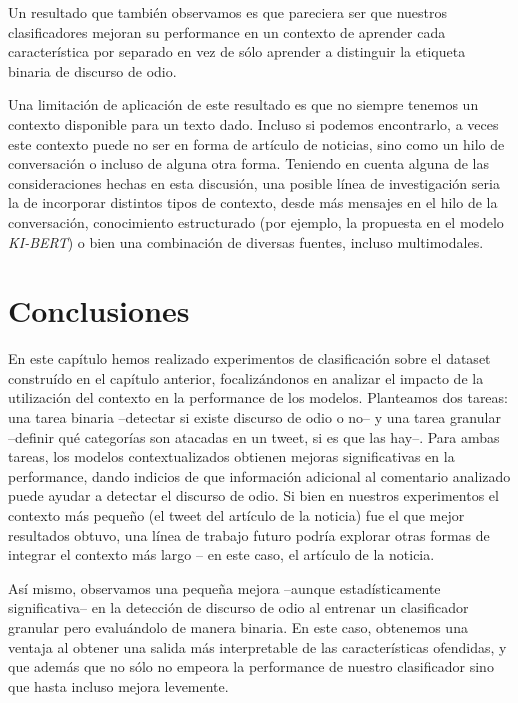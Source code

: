 Un resultado que también observamos es que pareciera ser que nuestros clasificadores mejoran su performance en un contexto de aprender cada característica por separado en vez de sólo aprender a distinguir la etiqueta binaria de discurso de odio.

Una limitación de aplicación de este resultado es que no siempre tenemos un contexto disponible para un texto dado. Incluso si podemos encontrarlo, a veces este contexto puede no ser en forma de artículo de noticias, sino como un hilo de conversación o incluso de alguna otra forma. Teniendo en cuenta alguna de las consideraciones hechas en esta discusión, una posible línea de investigación seria la de incorporar distintos tipos de contexto, desde más mensajes en el hilo de la conversación, conocimiento estructurado (por ejemplo, la propuesta en el modelo \emph{KI-BERT}\cite{faldu2021ki}) o bien una combinación de diversas fuentes, incluso multimodales. 

\section{Conclusiones}

En este capítulo hemos realizado experimentos de clasificación sobre el dataset construído en el capítulo anterior, focalizándonos en analizar el impacto de la utilización del contexto en la performance de los modelos. Planteamos dos tareas: una tarea binaria --detectar si existe discurso de odio o no-- y una tarea granular --definir qué categorías son atacadas en un tweet, si es que las hay--. Para ambas tareas, los modelos contextualizados obtienen mejoras significativas en la performance, dando indicios de que información adicional al comentario analizado puede ayudar a detectar el discurso de odio. Si bien en nuestros experimentos el contexto más pequeño (el tweet del artículo de la noticia) fue el que mejor resultados obtuvo, una línea de trabajo futuro podría explorar otras formas de integrar el contexto más largo -- en este caso, el artículo de la noticia.

Así mismo, observamos una pequeña mejora --aunque estadísticamente significativa-- en la detección de discurso de odio al entrenar un clasificador granular pero evaluándolo de manera binaria. En este caso, obtenemos una ventaja al obtener una salida más interpretable de las características ofendidas, y que además que no sólo no empeora la performance de nuestro clasificador sino que hasta incluso mejora levemente.

